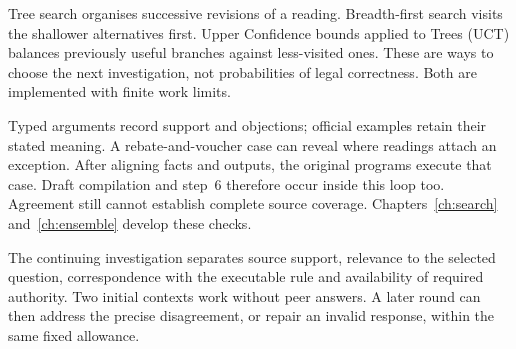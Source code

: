 Tree search organises successive revisions of a reading. Breadth-first search
visits the shallower alternatives first. Upper Confidence bounds applied to
Trees (UCT) balances previously useful branches against less-visited ones.
These are ways to choose the next investigation, not probabilities of legal
correctness. Both are implemented with finite work limits.

\begin{MapDiagram}
\end{MapDiagram}

Typed arguments record support and objections; official examples retain their
stated meaning. A rebate-and-voucher case can reveal where readings attach an
exception. After aligning facts and outputs, the original programs execute
that case. Draft compilation and step~6 therefore occur inside this loop too.
Agreement still cannot establish complete source coverage.
Chapters~\ref{ch:search} and~\ref{ch:ensemble} develop these checks.

\clearpage
{}
The continuing investigation separates source support, relevance to the selected
question, correspondence with the executable rule and availability of required
authority. Two initial contexts work without peer answers. A later round can
then address the precise disagreement, or repair an invalid response, within
the same fixed allowance.

